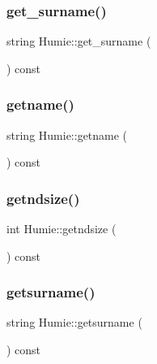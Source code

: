 \subsubsection{\texorpdfstring{get\_surname()}{get\_surname()}}
{\footnotesize\ttfamily string Humie\+::get\+\_\+surname (\begin{DoxyParamCaption}{ }\end{DoxyParamCaption}) const\hspace{0.3cm}{\ttfamily [inline]}}

\mbox{\label{class_humie_af8fb98fb0497bc9275736d8e1c01b652}} 
\subsubsection{\texorpdfstring{getname()}{getname()}}
{\footnotesize\ttfamily string Humie\+::getname (\begin{DoxyParamCaption}{ }\end{DoxyParamCaption}) const\hspace{0.3cm}{\ttfamily [inline]}}

\mbox{\label{class_humie_ad28e957f0069a8ee2c8a08fcf2dff1ac}} 
\subsubsection{\texorpdfstring{getndsize()}{getndsize()}}
{\footnotesize\ttfamily int Humie\+::getndsize (\begin{DoxyParamCaption}{ }\end{DoxyParamCaption}) const\hspace{0.3cm}{\ttfamily [inline]}}

\mbox{\label{class_humie_ac11db78b91e566789754bdfb5fb0e2a6}} 
\subsubsection{\texorpdfstring{getsurname()}{getsurname()}}
{\footnotesize\ttfamily string Humie\+::getsurname (\begin{DoxyParamCaption}{ }\end{DoxyParamCaption}) const\hspace{0.3cm}{\ttfamily [inline]}}

